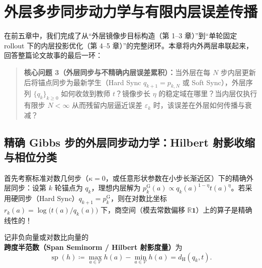 \documentclass[lang=cn,scheme=chinese,openany]{../book/elegantbook}
\newcommand{\R}{\mathbb R}
\begin{document}
\chapter{外层多步同步动力学与有限内层误差传播}
\label{ch:outer-dynamics}

在前五章中，我们完成了从“外层镜像步目标构造（第 1--3 章）”到“单轮固定 rollout 下的内层投影优化（第 4--5 章）”的完整闭环。本章将内外两层串联起来，回答整篇论文故事的最后一环：
\begin{quote}
\textbf{核心问题 3（外层同步与不精确内层误差累积）：}当外层在每 $N$ 步内层更新后将锚点同步为最新学生（Hard Sync $q_{k+1}=p_{k,N}$ 或 Soft Sync），外层序列 $\{q_k\}_{k\ge 0}$ 如何收敛到教师 $t$？镜像步长 $\eta$ 的稳定域在哪里？当内层仅执行有限步 $N<\infty$ 从而残留内层逼近误差 $\varepsilon_k$ 时，该误差在外层如何传播与衰减？
\end{quote}

\section{精确 Gibbs 步的外层同步动力学：Hilbert 射影收缩与相位分类}
\label{sec:exact-gibbs-outer}

首先考察标准对数几何步（$\kappa=0$，或任意形状参数在小步长渐近区）下的精确外层同步：设第 $k$ 轮锚点为 $q_k$，理想内层解为 $p^{\mathrm G}_k(a)\propto q_k(a)^{1-\eta} t(a)^\eta$。若采用硬同步（Hard Sync）$q_{k+1}=p^{\mathrm G}_k$，则在对数比坐标 $r_k(a)=\log\bigl(t(a)/q_k(a)\bigr)$ 下，商空间（模去常数偏移 $\R\mathbf 1$）上的算子是精确线性的！

记非负向量或对数比向量的\textbf{跨度半范数（Span Seminorm / Hilbert 射影度量）}为
\begin{equation}
 \operatorname{sp}(h) \coloneqq \max_{a\in\mathcal V} h(a) - \min_{a\in\mathcal V} h(a)
 = d_{\mathrm H}(q_k, t).
 \label{eq:span-seminorm-def}
\end{equation}
\end{document}
